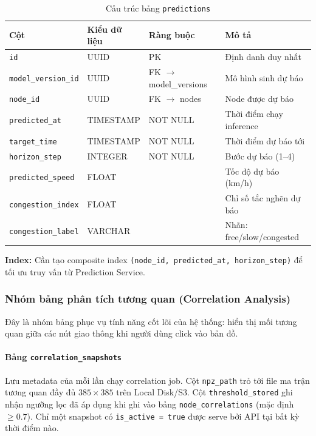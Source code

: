 \begin{table}[H]
\centering
\caption{Cấu trúc bảng \texttt{predictions}}
\begin{tabular}{|l|l|l|p{5cm}|}
\hline
\textbf{Cột} & \textbf{Kiểu dữ liệu} & \textbf{Ràng buộc} & \textbf{Mô tả} \\
\hline
\texttt{id} & UUID & PK & Định danh duy nhất \\
\texttt{model\_version\_id} & UUID & FK $\to$ model\_versions & Mô hình sinh dự báo \\
\texttt{node\_id} & UUID & FK $\to$ nodes & Node được dự báo \\
\texttt{predicted\_at} & TIMESTAMP & NOT NULL & Thời điểm chạy inference \\
\texttt{target\_time} & TIMESTAMP & NOT NULL & Thời điểm dự báo tới \\
\texttt{horizon\_step} & INTEGER & NOT NULL & Bước dự báo (1--4) \\
\texttt{predicted\_speed} & FLOAT & & Tốc độ dự báo (km/h) \\
\texttt{congestion\_index} & FLOAT & & Chỉ số tắc nghẽn dự báo \\
\texttt{congestion\_label} & VARCHAR & & Nhãn: free/slow/congested \\
\hline
\end{tabular}
\end{table}

\textbf{Index:} Cần tạo composite index \texttt{(node\_id, predicted\_at, horizon\_step)} để tối ưu truy vấn từ Prediction Service.

\subsubsection{Nhóm bảng phân tích tương quan (Correlation Analysis)}

Đây là nhóm bảng phục vụ tính năng cốt lõi của hệ thống: hiển thị mối tương quan giữa các nút giao thông khi người dùng click vào bản đồ.

\paragraph{Bảng \texttt{correlation\_snapshots}}
Lưu metadata của mỗi lần chạy correlation job. Cột \texttt{npz\_path} trỏ tới file ma trận tương quan đầy đủ $385 \times 385$ trên Local Disk/S3. Cột \texttt{threshold\_stored} ghi nhận ngưỡng lọc đã áp dụng khi ghi vào bảng \texttt{node\_correlations} (mặc định $\geq 0.7$). Chỉ một snapshot có \texttt{is\_active = true} được serve bởi API tại bất kỳ thời điểm nào.

